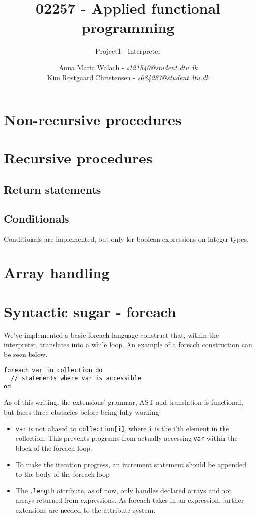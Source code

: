 \documentclass[10pt]{scrartcl}
\title{02257 - Applied functional programming}
\subtitle{Project1 - Interpreter}
\author{Anna Maria Walach - \textit {s121540@student.dtu.dk} \\ Kim Rostgaard Christensen - \textit {s084283@student.dtu.dk}}
\begin{document}
\maketitle
\section{Non-recursive procedures}

\section{Recursive procedures}
\subsection{Return statements}
\subsection{Conditionals}
Conditionals are implemented, but only for boolean expressions on integer types.


\section{Array handling}

\section{Syntactic sugar - foreach}
We've implemented a basic foreach language construct that, within the interpreter, translates into a while loop. An example of a foreach construction can be seen below.
  \begin{lstlisting}
foreach var in collection do
  // statements where var is accessible
od
 \end{lstlisting}
 As of this writing, the extensions' grammar, AST and translation is functional, but faces three obstacles before being fully working;
 \begin{itemize}
   \item \texttt{var} is not aliased to \texttt{collection[i]}, where \texttt{i} is the i'th element in the collection. This prevents programs from actually accessing \texttt{var} within the block of the foreach loop.
   \item To make the iteration progress, an increment statement should be appended to the body of the foreach loop
   \item The \texttt{.length} attribute, as of now, only handles declared arrays and not arrays returned from expressions. As foreach takes in an expression, further extensions are needed to the attribute system. 
\end{itemize}
\end{document}
